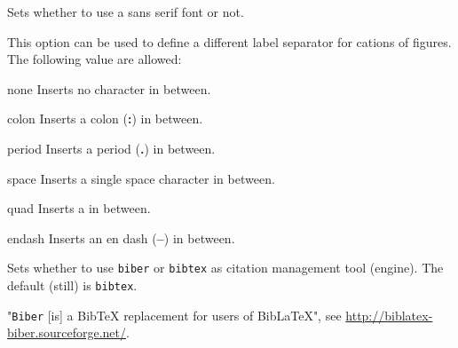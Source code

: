 \documentclass{ltxdockit}
\begin{document}
\begin{optionlist}


Sets whether to use a sans serif font or not.





This option can be used to define a different label separator for cations of figures. The following value are allowed:

\begin{valuelist}
\item[none] Inserts no character in between.
\item[colon] Inserts a colon (\textbf{:}) in between.
\item[period] Inserts a period (\textbf{.}) in between.
\item[space] Inserts a single space character in between.
\item[quad] Inserts a \cmd{\\quad} in between.
\item[endash] Inserts an en dash (\textbf{--}) in between.
\end{valuelist}




Sets whether to use \texttt{biber} or \texttt{bibtex} as citation management tool (engine).
The default (still) is \texttt{bibtex}.

"\texttt{Biber} [is] a BibTeX replacement for users of BibLaTeX", see \url{http://biblatex-biber.sourceforge.net/}.

\end{optionlist}
\end{document}
